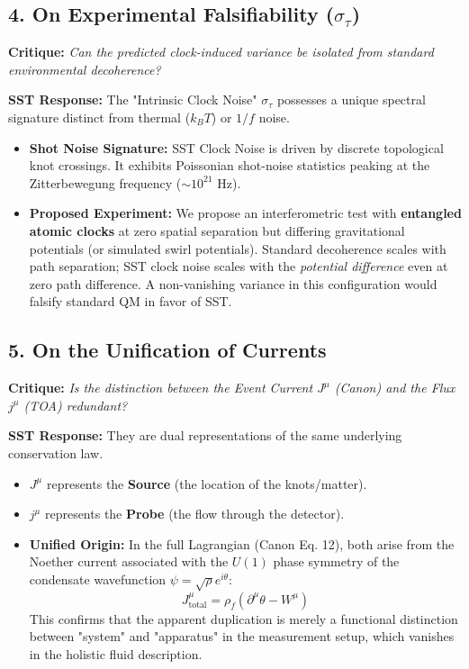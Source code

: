\documentclass[10pt]{article}
\begin{document}
\subsection*{4. On Experimental Falsifiability ($\sigma_\tau$)}
\noindent \textbf{Critique:} \textit{Can the predicted clock-induced variance be isolated from standard environmental decoherence?}

\noindent \textbf{SST Response:}
The "Intrinsic Clock Noise" $\sigma_\tau$ possesses a unique spectral signature distinct from thermal ($k_B T$) or $1/f$ noise.
\begin{itemize}
    \item \textbf{Shot Noise Signature:} SST Clock Noise is driven by discrete topological knot crossings. It exhibits Poissonian shot-noise statistics peaking at the Zitterbewegung frequency ($\sim 10^{21}$ Hz).
    \item \textbf{Proposed Experiment:} We propose an interferometric test with \textbf{entangled atomic clocks} at zero spatial separation but differing gravitational potentials (or simulated swirl potentials). Standard decoherence scales with path separation; SST clock noise scales with the \textit{potential difference} even at zero path difference. A non-vanishing variance in this configuration would falsify standard QM in favor of SST.
\end{itemize}

\subsection*{5. On the Unification of Currents}
\noindent \textbf{Critique:} \textit{Is the distinction between the Event Current $J^\mu$ (Canon) and the Flux $j^\mu$ (TOA) redundant?}

\noindent \textbf{SST Response:}
They are dual representations of the same underlying conservation law.
\begin{itemize}
    \item $J^\mu$ represents the \textbf{Source} (the location of the knots/matter).
    \item $j^\mu$ represents the \textbf{Probe} (the flow through the detector).
    \item \textbf{Unified Origin:} In the full Lagrangian (Canon Eq. 12), both arise from the Noether current associated with the $U(1)$ phase symmetry of the condensate wavefunction $\psi = \sqrt{\rho} e^{i\theta}$:
    \begin{equation}
        J_{\text{total}}^\mu = \rho_f (\partial^\mu \theta - W^\mu)
    \end{equation}
    This confirms that the apparent duplication is merely a functional distinction between "system" and "apparatus" in the measurement setup, which vanishes in the holistic fluid description.
\end{itemize}
\end{document}

